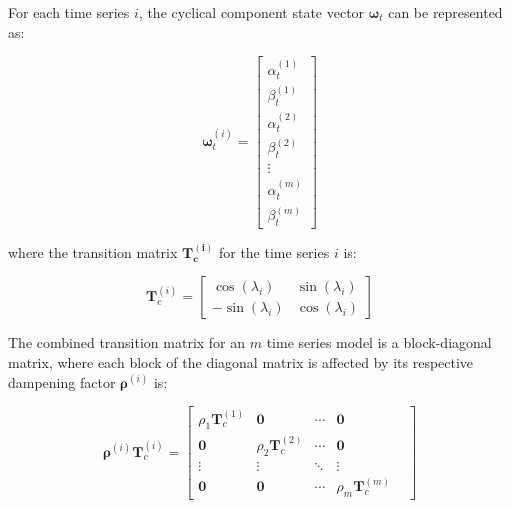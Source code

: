     For each time series $i$, the cyclical component state vector $\bm{\omega}_{t}$ can be represented as:

    \begin{equation}
        \bm{\omega}_{t}^{(i)}=
            \left[
                \begin{array}{c}
                    \alpha_{t}^{(1)} \\
                    \beta_{t}^{(1)} \\
                    \alpha_{t}^{(2)} \\
                    \beta_{t}^{(2)} \\
                    \vdots \\
                    \alpha_{t}^{(m)} \\
                    \beta_{t}^{(m)}
                \end{array}
            \right]
        \label{eq:cyclical_state_vector}
    \end{equation}

    where the transition matrix $\bm{T_c^{(i)}}$ for the time series $i$ is:

    \begin{equation}
        \bm{T}_c^{(i)}=
            \left[
                \begin{array}{cc}
                    \cos \left(\lambda_i\right) & \sin \left(\lambda_i\right) \\
                    -\sin \left(\lambda_i\right) & \cos \left(\lambda_i\right)
                \end{array}
            \right]
        \label{eq:cyclical_transition_matrix}
    \end{equation}

    The combined transition matrix for an $m$ time series model is a block-diagonal matrix,
    where each block of the diagonal matrix is affected by its respective dampening factor $\bm{\rho}^{(i)}$ is:

    \begin{equation}
        \bm{\rho}^{(i)} \bm{T}_c^{(i)} =
        \left[
            \begin{array}{ccccc}
                \rho_1 \bm{T}_c^{(1)} & \mathbf{0} & \cdots & \mathbf{0} \\
                \mathbf{0} & \rho_2 \bm{T}_c^{(2)} & \cdots & \mathbf{0} & \\
                \vdots & \vdots & \ddots & \vdots & \\
                \mathbf{0} & \mathbf{0} & \cdots & \rho_m \bm{T}_c^{(m)}
            \end{array}
        \right]
        \label{eq:cyclical_transition_mv}
    \end{equation}


